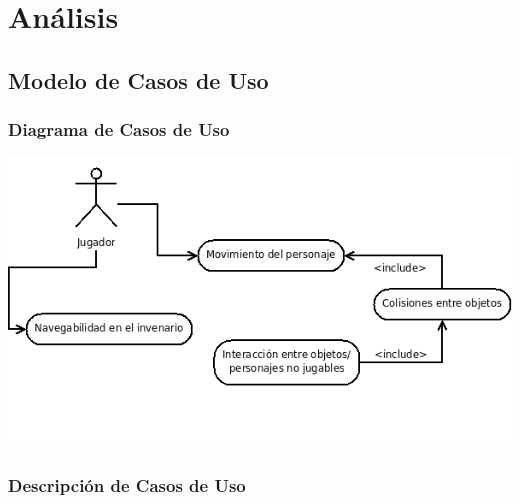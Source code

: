 \documentclass[a4paper,10pt]{article}
\begin{document}
\section{Análisis}
\subsection{Modelo de Casos de Uso}
\subsubsection{Diagrama de Casos de Uso}

\includegraphics[scale=0.6]{Diagrama_Casos_Uso.png}

\subsubsection{Descripción de Casos de Uso}
\end{document}

